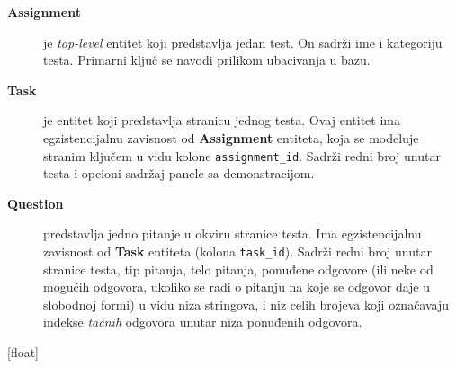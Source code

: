 \begin{description}
\item [\textbf{Assignment}] je \textit{top-level} entitet koji predstavlja jedan test. On sadrži ime i kategoriju testa. Primarni ključ se navodi prilikom ubacivanja u bazu.
\item [\textbf{Task}] je entitet koji predstavlja stranicu jednog testa. Ovaj entitet ima egzistencijalnu zavisnost od \textbf{Assignment} entiteta, koja se modeluje stranim ključem u vidu kolone \texttt{assignment\_id}. Sadrži redni broj unutar testa i opcioni sadržaj panele sa demonstracijom.
\item [\textbf{Question}] predstavlja jedno pitanje u okviru stranice testa. Ima egzistencijalnu zavisnost od \textbf{Task} entiteta (kolona \texttt{task\_id}). Sadrži redni broj unutar stranice testa, tip pitanja, telo pitanja, ponuđene odgovore (ili neke od mogućih odgovora, ukoliko se radi o pitanju na koje se odgovor daje u slobodnoj formi) u vidu niza stringova, i niz celih brojeva koji označavaju indekse \emph{tačnih} odgovora unutar niza ponuđenih odgovora.
\end{description}

[float]